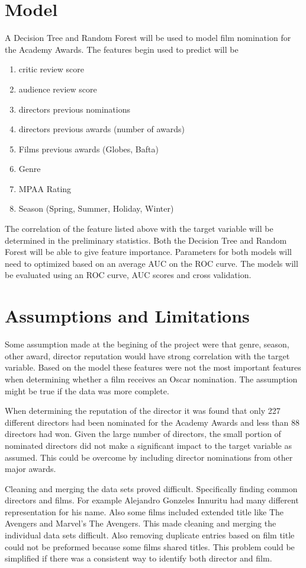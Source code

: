 \documentclass[]{report}
\begin{document}
\pagebreak
\section*{Model}

A Decision Tree and Random Forest will be used to model film nomination for the Academy Awards. The features begin used to predict will be 
\begin{enumerate}
	\item critic review score
	\item audience review score
	\item directors previous nominations 
	\item directors previous awards (number of awards)
	\item Films previous awards (Globes, Bafta)
	\item Genre
	\item MPAA Rating
	\item Season (Spring, Summer, Holiday, Winter)
\end{enumerate} 

The correlation of the feature listed above with the target variable will be determined in the preliminary statistics. Both the Decision Tree and Random Forest will be able to give feature importance. Parameters for both models will need to optimized based on an average AUC on the ROC curve. The models will be evaluated using an ROC curve, AUC scores and cross validation. 

\section*{Assumptions and Limitations} 
Some assumption made at the begining of the project were that genre, season, other award, director reputation would have strong correlation with the target variable. Based on the model these features were not the most important features when determining whether a film receives an Oscar nomination. The assumption might be true if the data was more complete. 

When determining the reputation of the director it was found that only 227 different directors had been nominated for the Academy Awards and less than 88 directors had won. Given the large number of directors, the small portion of nominated directors did not make a significant impact to the target variable as assumed. This could be overcome by including director nominations from other major awards. 


Cleaning and merging the data sets proved difficult. Specifically finding common directors and films. For example Alejandro Gonzeles Innuritu had many different representation for his name. Also some films included extended title like The Avengers and Marvel's The Avengers. This made cleaning and merging the individual data sets difficult. Also removing duplicate entries based on film title could not be preformed because some films shared titles. This problem could be simplified if there was a consistent way to identify both director and film. 
  
\end{document}
